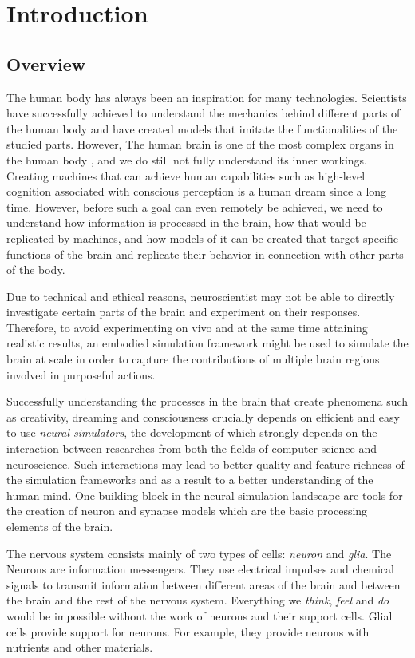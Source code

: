 \chapter{Introduction}

\section{Overview}


The human body has always been an inspiration for many technologies. Scientists have successfully achieved to understand the mechanics behind different parts of the human body and have created models that imitate the functionalities of the studied parts. However, The human brain is one of the most complex organs in the human body \citep{nolte2002human}, and we do still not fully understand its inner workings. Creating machines that can achieve human capabilities such as high-level cognition associated with conscious perception is a human dream since a long time. However, before such a goal can even remotely be achieved, we need to understand how information is processed in the brain, how that would be replicated by machines, and how models of it can be created that target specific functions of the brain and replicate their behavior in connection with other parts of the body. 

Due to technical and ethical reasons, neuroscientist may not be able to directly investigate certain parts of the brain and experiment on their responses. Therefore, to avoid experimenting on vivo and at the same time attaining realistic results, an embodied simulation framework \citep{10.3389/fninf.2022.884180} might be used to simulate the brain at scale in order to capture the contributions of multiple brain regions involved in purposeful actions.

Successfully understanding the processes in the brain that create phenomena such as creativity, dreaming and consciousness crucially depends on efficient and easy to use \emph{neural simulators}, the development of which strongly depends on the interaction between researches from both the fields of computer science and neuroscience. Such interactions may lead to better quality and feature-richness of the simulation frameworks and as a result to a better understanding of the human mind. One building block in the neural simulation landscape are tools for the creation of neuron and synapse models which are the basic processing elements of the brain. 


The nervous system consists mainly of two types of cells: \emph{neuron} and \emph{glia}. The Neurons are information messengers. They use electrical impulses and chemical signals to transmit information between different areas of the brain and between the brain and the rest of the nervous system. Everything we \emph{think}, \emph{feel} and \emph{do} would be impossible without the work of neurons and their support cells. Glial cells provide support for neurons. For example, they provide neurons with nutrients and other materials.


